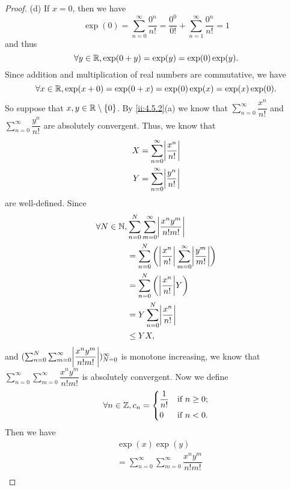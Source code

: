 \begin{proof}{(d)}
  If \(x = 0\), then we have
  \[
    \exp(0) = \sum_{n = 0}^\infty \dfrac{0^n}{n!} = \dfrac{0^0}{0!} + \sum_{n = 1}^\infty \dfrac{0^n}{n!} = 1
  \]
  and thus
  \[
    \forall y \in \mathbb{R}, \exp(0 + y) = \exp(y) = \exp(0) \exp(y).
  \]
  Since addition and multiplication of real numbers are commutative, we have
  \[
    \forall x \in \mathbb{R}, \exp(x + 0) = \exp(0 + x) = \exp(0) \exp(x) = \exp(x) \exp(0).
  \]
  So suppose that \(x, y \in \mathbb{R} \setminus \left\lbrace0\right\rbrace\).
  By \cref{ii:4.5.2}(a) we know that \(\sum_{n = 0}^\infty \dfrac{x^n}{n!}\) and \(\sum_{n = 0}^\infty \dfrac{y^n}{n!}\) are absolutely convergent.
  Thus, we know that
  \begin{align*}
    X & = \sum_{n = 0}^\infty \abs{\dfrac{x^n}{n!}} \\
    Y & = \sum_{n = 0}^\infty \abs{\dfrac{y^n}{n!}}
  \end{align*}
  are well-defined.
  Since
  \begin{align*}
    \forall N \in \N, & \sum_{n = 0}^N \sum_{m = 0}^\infty \abs{\dfrac{x^n y^m}{n! m!}}                              \\
                      & = \sum_{n = 0}^N \bigg(\abs{\dfrac{x^n}{n!}} \sum_{m = 0}^\infty \abs{\dfrac{y^m}{m!}}\bigg) \\
                      & = \sum_{n = 0}^N \bigg(\abs{\dfrac{x^n}{n!}} Y\bigg)                                         \\
                      & = Y \sum_{n = 0}^N \abs{\dfrac{x^n}{n!}}                                                     \\
                      & \leq Y X,
  \end{align*}
  and \((\sum_{n = 0}^N \sum_{m = 0}^\infty \abs{\dfrac{x^n y^m}{n! m!}})_{N = 0}^\infty\) is monotone increasing, we know that \(\sum_{n = 0}^\infty \sum_{m = 0}^\infty \dfrac{x^n y^m}{n! m!}\) is absolutely convergent.
  Now we define
  \[
    \forall n \in \mathbb{Z}, c_n = \begin{dcases}
      \dfrac{1}{n!} & \text{if } n \geq 0; \\
      0             & \text{if } n < 0.
    \end{dcases}
  \]
  Then we have
  \begin{align*}
     & \exp(x) \exp(y)                                                                                                                                                           \\
     & = \sum_{n = 0}^\infty \sum_{m = 0}^\infty \dfrac{x^n y^m}{n! m!}                                                                                                          \\

\end{align*}
\end{proof}
